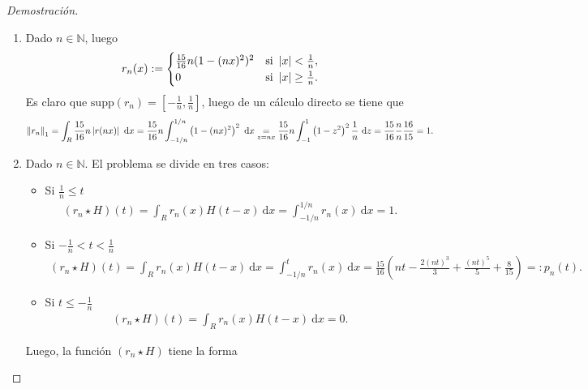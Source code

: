 \documentclass[10pt,a4paper]{report}
\newcommand{\abs}[2][y]{\if#1y\left\fi\lvert#2\if#1y\right\fi\rvert}
\newcommand{\norm}[2][y]{{\if#1y\left\fi\lVert#2\if#1y\right\fi\rVert}}
\theoremstyle{definition}
\renewcommand{\theproblem}{\Alph{problem}}
\numberwithin{equation}{problem}
\providecommand{\abs}[1]{\left\lvert#1\right\rvert}
\providecommand{\norm}[1]{\left\lVert#1\right\rVert}
\begin{document}
\begin{proof}[\textcolor{rojo}{Demostración}]
\begin{enumerate}[label=\textbf{\theproblem.\arabic{*}.},ref=\theproblem.\arabic{*},parsep=1ex]
\begin{align*}
              \end{align*}
              \item Dado $n\in \mathbb{N}$, luego 
              \begin{equation*}
              	r_{n}(x) := \begin{cases}
              		\frac{15}{16}n(1-(nx)^2)^2 & \text{si } \abs{x}<\frac{1}{n},\\
              		0 & \text{si } \abs{x} \geq \frac{1}{n}.
              	\end{cases}
              \end{equation*}
              Es claro que $\text{supp}(r_{n}) = \left[-\frac{1}{n},\frac{1}{n}\right]$, luego de un cálculo directo se tiene que
              \begin{align*}
              	\norm{r_{n}}_{1} = \int_{R}\frac{15}{16}n\abs{r(nx)}\ \text{d}x =  \frac{15}{16}n\int_{-1/n}^{1/n}\left(1-(nx)^{2}\right)^{2}\ \text{d}x \underset{z = nx}{=} \frac{15}{16}n\int_{-1}^{1}\left(1-z^{2}\right)^{2}\frac{1}{n}\ \text{d}z = \frac{15}{16}\frac{n}{n}\frac{16}{15} = 1.
              \end{align*}
              \newpage
              \item Dado $n\in \mathbb{N}$. El problema se divide en tres casos:
              \begin{itemize}
              	\item Si $\frac{1}{n}\leq t$
              	\begin{align*}
              		\left(r_{n}\star H\right)(t) = \int_{R}r_{n}(x)H(t-x)\ \text{d}x = \int_{-1/n}^{1/n}r_{n}(x)\ \text{d}x = 1.
              	\end{align*} 
              	\item Si $-\frac{1}{n}< t < \frac{1}{n}$
              	\begin{align*}
              		\left(r_{n}\star H\right)(t) = \int_{R}r_{n}(x)H(t-x)\ \text{d}x = \int_{-1/n}^{t}r_{n}(x)\ \text{d}x = \frac{15}{16}\left(nt - \frac{2(nt)^{3}}{3} + \frac{(nt)^{5}}{5} + \frac{8}{15}\right) =: p_{n}(t).
              	\end{align*}
                \item Si $t\leq -\frac{1}{n}$
                \begin{align*}
                	\left(r_{n}\star H\right)(t) = \int_{R}r_{n}(x)H(t-x)\ \text{d}x = 0.
                \end{align*}
              \end{itemize}
              Luego, la función $\left(r_{n}\star H\right)$ tiene la forma

\end{enumerate}
\end{proof}
\end{document}
